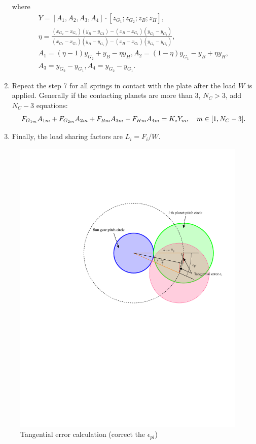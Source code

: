 \documentclass[a4paper,fleqn]{cas-sc}%
\begin{document}
\begin{enumerate}
    where
    \begin{equation}
        \begin{split}
            Y=[A_1,A_2,A_3,A_4] \cdot [z_{G_1};z_{G_2};z_B;z_H],\\
            \eta=\frac{(x_{G_2}-x_{G_1})(y_B-y_{G1})-(x_B-x_{G_1})(y_{G_2}-y_{G_1})}{(x_{G_2}-x_{G_1})(y_H-y_{G_1})-(x_H-x_{G_1})(y_{G_2}-y_{G_1})},\\
            A_1=(\eta-1)y_{G_2}+y_B-\eta y_H,    A_2=(1-\eta)y_{G_1}-y_B+\eta y_H,\\
            A_3=y_{G_2}-y_{G_1},A_4=y_{G_2}-y_{G_1}.
        \end{split}
    \end{equation}
    \item Repeat the step 7 for all springs in contact with the plate after the load $W$ is applied. Generally if the contacting planets are more than 3, $N_C>3$, add $N_C-3$ equations:
    \begin{equation}
        F_{G_{1m}}A_{1m}+F_{G_{2m}}A_{2m}+F_{Bm}A_{3m}-F_{Hm}A_{4m}=K_{\rm e}Y_m,\quad m\in[1,N_C-3].
    \end{equation}
    \item Finally, the load sharing factors are $L_i=F_i/W$.
\end{enumerate}
\begin{figure}[pos=htbp]
    \centering
    \includegraphics[scale=0.5]{tangential_error.pdf}
    \caption{Tangential error calculation (correct the $\epsilon_{pi}$)}
    \label{fig:tangential_error}
\end{figure}
\end{document}
